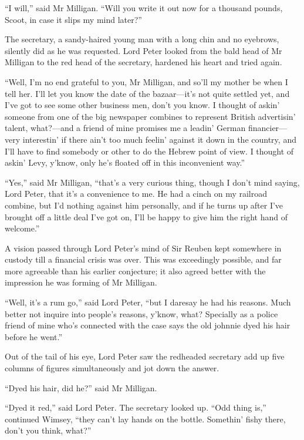 \enquote{I will,} said Mr Milligan. \enquote{Will you write it out now for a thousand pounds, Scoot, in case it slips my mind later?}

The secretary, a sandy-haired young man with a long chin and no eyebrows, silently did as he was requested. Lord Peter looked from the bald head of Mr Milligan to the red head of the secretary, hardened his heart and tried again.

\enquote{Well, I’m no end grateful to you, Mr Milligan, and so’ll my mother be when I tell her. I’ll let you know the date of the bazaar\allowbreak---\allowbreak it’s not quite settled yet, and I’ve got to see some other business men, don’t you know. I thought of askin’ someone from one of the big newspaper combines to represent British advertisin’ talent, what?---and a friend of mine promises me a leadin’ German financier\allowbreak---\allowbreak very interestin’ if there ain’t too much feelin’ against it down in the country, and I’ll have to find somebody or other to do the Hebrew point of view. I thought of askin’ Levy, y’know, only he’s floated off in this inconvenient way.}

\enquote{Yes,} said Mr Milligan, \enquote{that’s a very curious thing, though I don’t mind saying, Lord Peter, that it’s a convenience to me. He had a cinch on my railroad combine, but I’d nothing against him personally, and if he turns up after I’ve brought off a little deal I’ve got on, I’ll be happy to give him the right hand of welcome.}

A vision passed through Lord Peter’s mind of Sir Reuben kept somewhere in custody till a financial crisis was over. This was exceedingly possible, and far more agreeable than his earlier conjecture; it also agreed better with the impression he was forming of Mr Milligan.

\enquote{Well, it’s a rum go,} said Lord Peter, \enquote{but I daresay he had his reasons. Much better not inquire into people’s reasons, y’know, what? Specially as a police friend of mine who’s connected with the case says the old johnnie dyed his hair before he went.}

Out of the tail of his eye, Lord Peter saw the redheaded secretary add up five columns of figures simultaneously and jot down the answer.

\enquote{Dyed his hair, did he?} said Mr Milligan.

\enquote{Dyed it red,} said Lord Peter. The secretary looked up. \enquote{Odd thing is,} continued Wimsey, \enquote{they can’t lay hands on the bottle. Somethin’ fishy there, don’t you think, what?}

